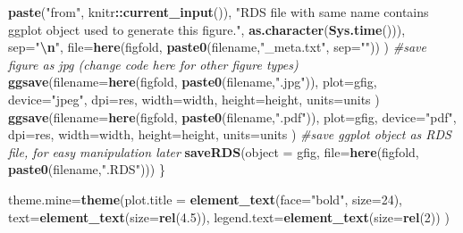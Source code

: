 \documentclass[
]{article}
\newenvironment{Shaded}{\begin{snugshade}}{\end{snugshade}}
\newcommand{\AttributeTok}[1]{\textcolor[rgb]{0.13,0.29,0.53}{#1}}
\newcommand{\CommentTok}[1]{\textcolor[rgb]{0.56,0.35,0.01}{\textit{#1}}}
\newcommand{\DecValTok}[1]{\textcolor[rgb]{0.00,0.00,0.81}{#1}}
\newcommand{\FloatTok}[1]{\textcolor[rgb]{0.00,0.00,0.81}{#1}}
\newcommand{\FunctionTok}[1]{\textcolor[rgb]{0.13,0.29,0.53}{\textbf{#1}}}
\newcommand{\NormalTok}[1]{#1}
\newcommand{\OtherTok}[1]{\textcolor[rgb]{0.56,0.35,0.01}{#1}}
\newcommand{\SpecialCharTok}[1]{\textcolor[rgb]{0.81,0.36,0.00}{\textbf{#1}}}
\newcommand{\StringTok}[1]{\textcolor[rgb]{0.31,0.60,0.02}{#1}}
\begin{document}
\begin{Shaded}
\begin{Highlighting}[]
        \FunctionTok{paste}\NormalTok{(}\StringTok{"from"}\NormalTok{, knitr}\SpecialCharTok{::}\FunctionTok{current\_input}\NormalTok{()),}
        \StringTok{"RDS file with same name contains ggplot object used to generate this figure."}\NormalTok{,}
        \FunctionTok{as.character}\NormalTok{(}\FunctionTok{Sys.time}\NormalTok{())),}
      \AttributeTok{sep=}\StringTok{"}\SpecialCharTok{\textbackslash{}n}\StringTok{"}\NormalTok{,}
      \AttributeTok{file=}\FunctionTok{here}\NormalTok{(figfold, }\FunctionTok{paste0}\NormalTok{(filename,}\StringTok{"\_meta.txt"}\NormalTok{, }\AttributeTok{sep=}\StringTok{""}\NormalTok{))}
\NormalTok{  )}
  \CommentTok{\#save figure as jpg (change code here for other figure types)}
  \FunctionTok{ggsave}\NormalTok{(}\AttributeTok{filename=}\FunctionTok{here}\NormalTok{(figfold, }\FunctionTok{paste0}\NormalTok{(filename,}\StringTok{".jpg"}\NormalTok{)),}
         \AttributeTok{plot=}\NormalTok{gfig,}
         \AttributeTok{device=}\StringTok{"jpeg"}\NormalTok{,}
         \AttributeTok{dpi=}\NormalTok{res,}
         \AttributeTok{width=}\NormalTok{width, }\AttributeTok{height=}\NormalTok{height, }\AttributeTok{units=}\NormalTok{units}
\NormalTok{  )}
  \FunctionTok{ggsave}\NormalTok{(}\AttributeTok{filename=}\FunctionTok{here}\NormalTok{(figfold, }\FunctionTok{paste0}\NormalTok{(filename,}\StringTok{".pdf"}\NormalTok{)),}
         \AttributeTok{plot=}\NormalTok{gfig,}
         \AttributeTok{device=}\StringTok{"pdf"}\NormalTok{,}
         \AttributeTok{dpi=}\NormalTok{res,}
         \AttributeTok{width=}\NormalTok{width, }\AttributeTok{height=}\NormalTok{height, }\AttributeTok{units=}\NormalTok{units}
\NormalTok{  )}
  \CommentTok{\#save ggplot object as RDS file, for easy manipulation later}
  \FunctionTok{saveRDS}\NormalTok{(}\AttributeTok{object =}\NormalTok{ gfig, }\AttributeTok{file=}\FunctionTok{here}\NormalTok{(figfold, }\FunctionTok{paste0}\NormalTok{(filename,}\StringTok{".RDS"}\NormalTok{)))}
\NormalTok{\}}
\end{Highlighting}
\end{Shaded}

\begin{Shaded}
\begin{Highlighting}[]
\NormalTok{theme.mine}\OtherTok{=}\FunctionTok{theme}\NormalTok{(}\AttributeTok{plot.title =} \FunctionTok{element\_text}\NormalTok{(}\AttributeTok{face=}\StringTok{"bold"}\NormalTok{, }\AttributeTok{size=}\DecValTok{24}\NormalTok{),}
                 \AttributeTok{text=}\FunctionTok{element\_text}\NormalTok{(}\AttributeTok{size=}\FunctionTok{rel}\NormalTok{(}\FloatTok{4.5}\NormalTok{)),}
                 \AttributeTok{legend.text=}\FunctionTok{element\_text}\NormalTok{(}\AttributeTok{size=}\FunctionTok{rel}\NormalTok{(}\DecValTok{2}\NormalTok{))}
\NormalTok{)}
\end{Highlighting}
\end{Shaded}
\end{document}
